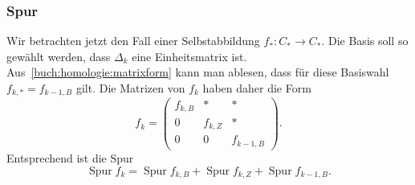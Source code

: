 \subsubsection{Spur}
Wir betrachten jetzt den Fall einer Selbstabbildung $f_*\colon C_*\to C_*$.
Die Basis soll so gewählt werden, dass $\Delta_k$ eine Einheitsmatrix ist.
Aus~\eqref{buch:homologie:matrixform} kann man ablesen, dass für diese
Basiswahl $f_{k,*}=f_{k-1,B}$ gilt.
Die Matrizen von $f_k$ haben daher die Form
\[
f_k
=
\begin{pmatrix}
f_{k,B} &    *    & * \\
   0    & f_{k,Z} & * \\
   0    &   0     & f_{k-1,B}
\end{pmatrix}.
\]
Entsprechend ist die Spur
\begin{equation}
\operatorname{Spur} f_k
=
\operatorname{Spur} f_{k,B}
+
\operatorname{Spur} f_{k,Z}
+
\operatorname{Spur} f_{k-1,B}.
\label{buch:homologie:eqn:spur}
\end{equation}



